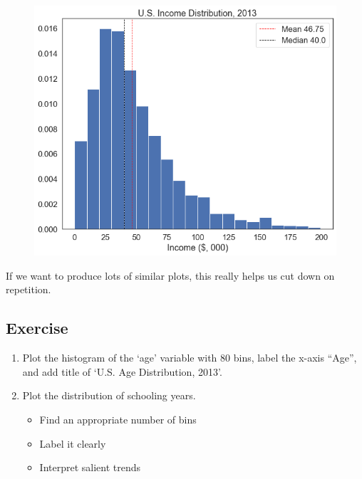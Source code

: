 \documentclass[
  letterpaper,
  DIV=11,
  numbers=noendperiod]{scrreprt}
\newenvironment{Shaded}{\begin{snugshade}}{\end{snugshade}}
\newcommand{\DecValTok}[1]{\textcolor[rgb]{0.68,0.00,0.00}{#1}}
\newcommand{\NormalTok}[1]{\textcolor[rgb]{0.00,0.23,0.31}{#1}}
\newcommand{\OperatorTok}[1]{\textcolor[rgb]{0.37,0.37,0.37}{#1}}
\newcommand{\StringTok}[1]{\textcolor[rgb]{0.13,0.47,0.30}{#1}}
\providecommand{\tightlist}{%
  \setlength{\itemsep}{0pt}\setlength{\parskip}{0pt}}\usepackage{longtable,booktabs,array}
\begin{document}
\begin{Shaded}
\end{Shaded}

\begin{figure}[H]

{\centering \includegraphics{notebooks/W05. Distributions and Basic Statistics_files/figure-pdf/cell-19-output-1.png}

}

\end{figure}

If we want to produce lots of similar plots, this really helps us cut
down on repetition.

\hypertarget{exercise-13}{%
\subsection{Exercise}\label{exercise-13}}

\begin{enumerate}
\def\labelenumi{\arabic{enumi}.}
\tightlist
\item
  Plot the histogram of the `age' variable with 80 bins, label the
  x-axis ``Age'', and add title of `U.S. Age Distribution, 2013'.
\item
  Plot the distribution of schooling years.

  \begin{itemize}
  \tightlist
  \item
    Find an appropriate number of bins
  \item
    Label it clearly
  \item
    Interpret salient trends
  \end{itemize}
\end{enumerate}
\end{document}
